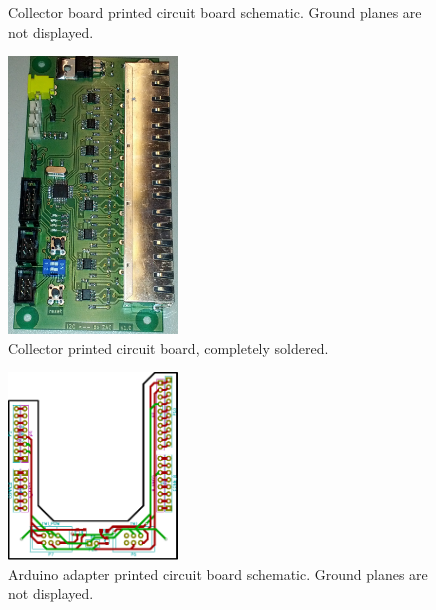 \documentclass[a4paper]{scrreprt}
\begin{document}
\begin{appendices}
\begin{figure}[Hh!]
	\caption{Collector board printed circuit board schematic. Ground planes are not displayed.}
	\label{fig:pcb_collector} %
\end{figure}
\begin{figure}[Hh!]
	\centering
	\includegraphics[width=0.4\textwidth]{img/boards/collector_complete.jpg}
	\caption{Collector printed circuit board, completely soldered.}
	\label{fig:soldered_col}
\end{figure}
\begin{figure}[Hh!]
	\centering
	\includegraphics[width=0.4\textwidth]{img/boards/arduino_kicad.pdf}
	\caption{Arduino adapter printed circuit board schematic. Ground planes are not displayed.}
	\label{fig:pcb_arduino} %
\end{figure}


\end{appendices}
\end{document}
